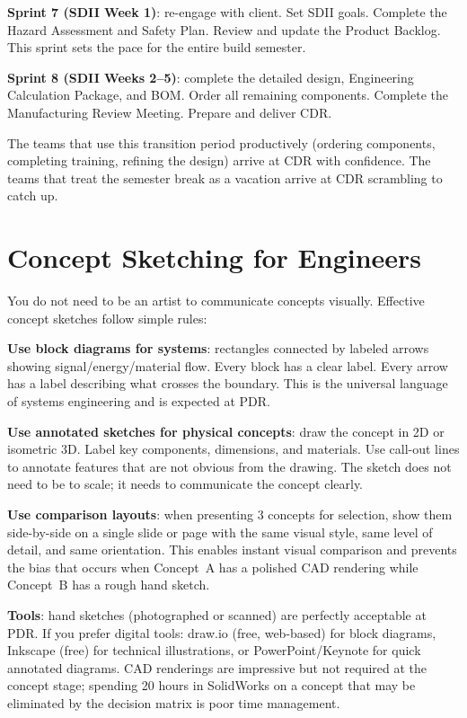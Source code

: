 \textbf{Sprint 7 (SDII Week 1)}: re-engage with client. Set SDII goals. Complete the Hazard Assessment and Safety Plan. Review and update the Product Backlog. This sprint sets the pace for the entire build semester.

\textbf{Sprint 8 (SDII Weeks 2--5)}: complete the detailed design, Engineering Calculation Package, and BOM. Order all remaining components. Complete the Manufacturing Review Meeting. Prepare and deliver CDR.

The teams that use this transition period productively (ordering components, completing training, refining the design) arrive at CDR with confidence. The teams that treat the semester break as a vacation arrive at CDR scrambling to catch up.



\section{Concept Sketching for Engineers}
You do not need to be an artist to communicate concepts visually. Effective concept sketches follow simple rules:

\textbf{Use block diagrams for systems}: rectangles connected by labeled arrows showing signal/energy/material flow. Every block has a clear label. Every arrow has a label describing what crosses the boundary. This is the universal language of systems engineering and is expected at PDR.

\textbf{Use annotated sketches for physical concepts}: draw the concept in 2D or isometric 3D. Label key components, dimensions, and materials. Use call-out lines to annotate features that are not obvious from the drawing. The sketch does not need to be to scale; it needs to communicate the concept clearly.

\textbf{Use comparison layouts}: when presenting 3 concepts for selection, show them side-by-side on a single slide or page with the same visual style, same level of detail, and same orientation. This enables instant visual comparison and prevents the bias that occurs when Concept~A has a polished CAD rendering while Concept~B has a rough hand sketch.

\textbf{Tools}: hand sketches (photographed or scanned) are perfectly acceptable at PDR. If you prefer digital tools: draw.io (free, web-based) for block diagrams, Inkscape (free) for technical illustrations, or PowerPoint/Keynote for quick annotated diagrams. CAD renderings are impressive but not required at the concept stage; spending 20 hours in SolidWorks on a concept that may be eliminated by the decision matrix is poor time management.


